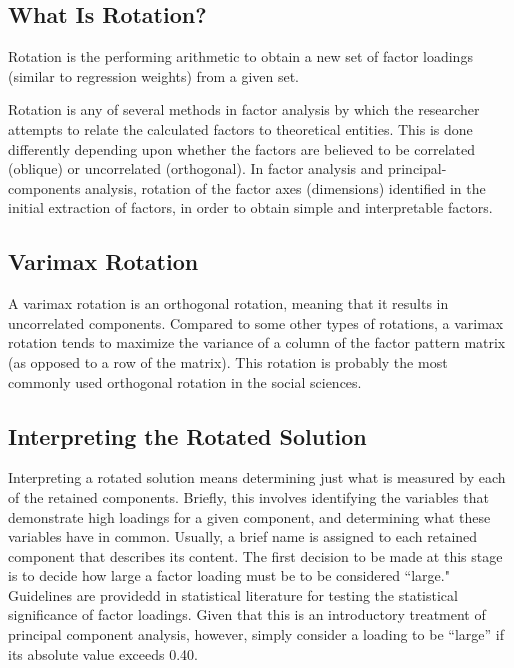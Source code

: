 \documentclass[a4paper,12pt]{article}
\begin{document}
\subsection{What Is Rotation?}
Rotation is the performing arithmetic to obtain a new set of factor loadings (similar to regression weights) from a given set.

Rotation is any of several methods in factor analysis by which the researcher attempts to relate the calculated factors to theoretical entities. This is done differently depending upon whether the factors are believed to be correlated (oblique) or uncorrelated
(orthogonal). In factor analysis and principal-components analysis, rotation of the factor axes
(dimensions) identified in the initial extraction of factors, in order to obtain simple and interpretable
factors.
\subsection{Varimax Rotation}
A varimax rotation is an orthogonal rotation, meaning that
it results in uncorrelated components. Compared to some other types of rotations, a varimax
rotation tends to maximize the variance of a column of the factor pattern matrix (as opposed to a
row of the matrix). This rotation is probably the most commonly used orthogonal rotation in the
social sciences.

\subsection{Interpreting the Rotated Solution}

Interpreting a rotated solution means determining just what is measured by each of the retained
components. Briefly, this involves identifying the variables that demonstrate high loadings for a
given component, and determining what these variables have in common. Usually, a brief name
is assigned to each retained component that describes its content.
The first decision to be made at this stage is to decide how large a factor loading must be to be
considered ``large."
Guidelines are providedd in statistical literature for testing the statistical significance of factor loadings. Given that this
is an introductory treatment of principal component analysis, however, simply consider a loading
to be “large” if its absolute value exceeds 0.40.
\end{document}
